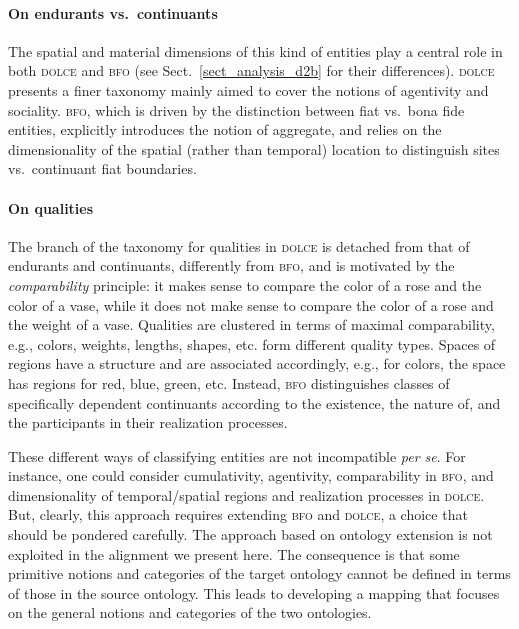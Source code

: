 \documentclass[ao]{iosart2x}
\newcommand{\dolce}{{\textsc{dolce}}}
\newcommand{\bfo}{{\textsc{bfo}}}
\begin{document}
\paragraph{On endurants vs.~continuants} The spatial and material dimensions of this kind of entities play a central role in both {\dolce} and {\bfo} (see Sect.~\ref{sect_analysis_d2b} for their differences). {\dolce} presents a finer taxonomy mainly aimed to cover the notions of agentivity and sociality. {\bfo}, which is driven by the distinction between fiat vs.~bona fide entities, explicitly introduces the notion of aggregate, and relies on the dimensionality of the spatial (rather than temporal) location to distinguish sites vs.~continuant fiat boundaries.

\paragraph{On qualities} The branch of the taxonomy for qualities in {\dolce} is detached from that of endurants and continuants, differently from {\bfo}, and is motivated by the \emph{comparability} principle: it makes sense to compare the color of a rose and the color of a vase, while it does not make sense to compare the color of a rose and the weight of a vase. Qualities are clustered in terms of maximal comparability, e.g., colors, weights, lengths, shapes, etc. form different quality types. Spaces of regions have a structure and are associated accordingly, e.g., for colors, the space has regions for red, blue, green, etc. Instead, {\bfo} distinguishes classes of specifically dependent continuants according to the existence, the nature of, and the participants in their realization processes.

\smallskip
These different ways of classifying entities are not incompatible \textit{per se}. For instance, one could consider cumulativity, agentivity, comparability in {\bfo}, and dimensionality of temporal/spatial regions and realization processes in {\dolce}. But, clearly, this approach requires extending {\bfo} and {\dolce}, a choice that should be pondered carefully. The approach based on ontology extension is not exploited in the alignment we present here. The consequence is that some primitive notions and categories of the target ontology cannot be defined in terms of those in the source ontology. This leads to developing a mapping that focuses on the general notions and categories of the two ontologies.
   
\end{document}
